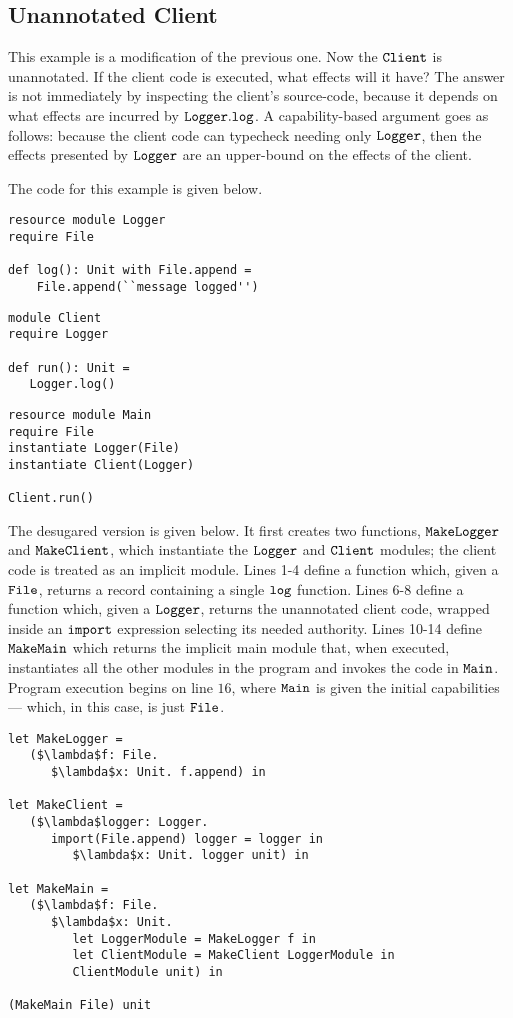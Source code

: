 \subsection{Unannotated Client}

This example is a modification of the previous one. Now the $\mathtt{Client}$ is unannotated. If the client code is executed, what effects will it have? The answer is not immediately by inspecting the client's source-code, because it depends on what effects are incurred by $\mathtt{Logger.log}$. A capability-based argument goes as follows: because the client code can typecheck needing only $\mathtt{Logger}$, then the effects presented by $\mathtt{Logger}$ are an upper-bound on the effects of the client.

The code for this example is given below.

\begin{lstlisting}
resource module Logger
require File

def log(): Unit with File.append =
    File.append(``message logged'')
\end{lstlisting}

\begin{lstlisting}
module Client
require Logger

def run(): Unit =
   Logger.log()
\end{lstlisting}

\begin{lstlisting}
resource module Main
require File
instantiate Logger(File)
instantiate Client(Logger)

Client.run()
\end{lstlisting}

The desugared version is given below. It first creates two functions, $\mathtt{MakeLogger}$ and $\mathtt{MakeClient}$, which instantiate the $\mathtt{Logger}$ and $\mathtt{Client}$ modules; the client code is treated as an implicit module. Lines 1-4 define a function which, given a $\mathtt{File}$, returns a record containing a single $\mathtt{log}$ function. Lines 6-8 define a function which, given a $\mathtt{Logger}$, returns the unannotated client code, wrapped inside an $\mathtt{import}$ expression selecting its needed authority. Lines 10-14 define $\mathtt{MakeMain}$ which returns the implicit main module that, when executed, instantiates all the other modules in the program and invokes the code in $\mathtt{Main}$. Program execution begins on line $16$, where $\mathtt{Main}$ is given the initial capabilities --- which, in this case, is just $\mathtt{File}$.

\begin{lstlisting}
let MakeLogger =
   ($\lambda$f: File.
      $\lambda$x: Unit. f.append) in
          
let MakeClient =
   ($\lambda$logger: Logger.
      import(File.append) logger = logger in
         $\lambda$x: Unit. logger unit) in
          
let MakeMain =
   ($\lambda$f: File.
      $\lambda$x: Unit.
         let LoggerModule = MakeLogger f in
         let ClientModule = MakeClient LoggerModule in
         ClientModule unit) in

(MakeMain File) unit
\end{lstlisting}

